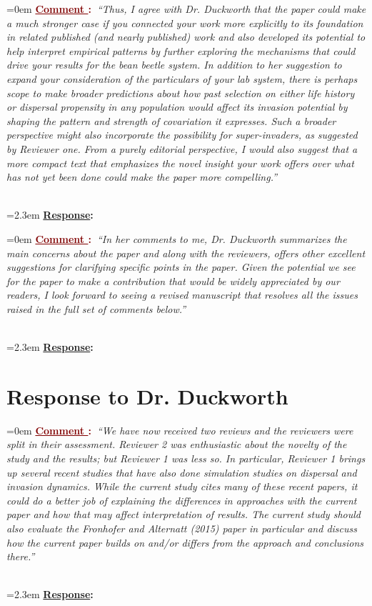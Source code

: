 \documentclass[12pt]{article}
\newcounter{cN}
\newcommand{\comment}[1]{
	\vspace{2em}
	\refstepcounter{cN} %
	\noindent \hangindent=0em \textbf{\textcolor{Maroon}{\uline{Comment \thecN}:~}}\emph{``#1''}
	}
\newcommand{\response}[1]{
	\\[0.25em]
	\hangindent=2.3em \textbf{\textcolor{NavyBlue}{\uline{Response}:~}}#1
	}
\begin{document}
\comment{Thus, I agree with Dr. Duckworth that the paper could make a much stronger case if you connected your work more explicitly to its foundation in related published (and nearly published) work and also developed its potential to help interpret empirical patterns by further exploring the mechanisms that could drive your results for the bean beetle system.
In addition to her suggestion to expand your consideration of the particulars of your lab system, there is perhaps scope to make broader predictions about how past selection on either life history or dispersal propensity in any population would affect its invasion potential by shaping the pattern and strength of covariation it expresses.
Such a broader perspective might also incorporate the possibility for super-invaders, as suggested by Reviewer one.
From a purely editorial perspective, I would also suggest that a more compact text that emphasizes the novel insight your work offers over what has not yet been done could make the paper more compelling.}
\response{}

\comment{In her comments to me, Dr. Duckworth summarizes the main concerns about the paper and along with the reviewers, offers other excellent suggestions for clarifying specific points in the paper.
Given the potential we see for the paper to make a contribution that would be widely appreciated by our readers, I look forward to seeing a revised manuscript that resolves all the issues raised in the full set of comments below.}
\response{}

\section{Response to Dr. Duckworth}
\vspace{-2em}

\comment{We have now received two reviews and the reviewers were split in their assessment. Reviewer 2 was enthusiastic about the novelty of the study and the results; but Reviewer 1 was less so.
In particular, Reviewer 1 brings up several recent studies that have also done simulation studies on dispersal and invasion dynamics.
While the current study cites many of these recent papers, it could do a better job of explaining the differences in approaches with the current paper and how that may affect interpretation of results.
The current study should also evaluate the Fronhofer and Alternatt (2015) paper in particular and discuss how the current paper builds on and/or differs from the approach and conclusions there.}
\response{}
\end{document}
